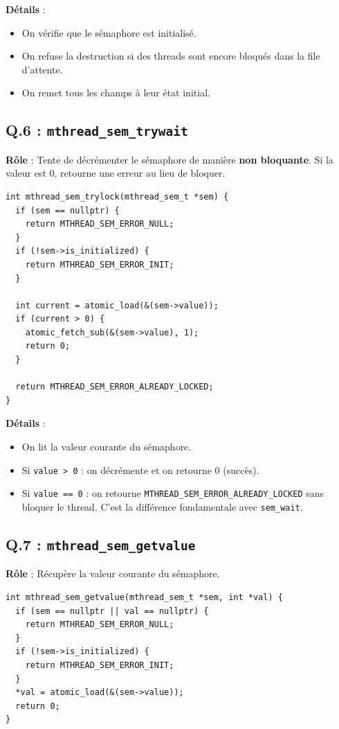 \documentclass[12pt,a4paper]{article}
\begin{document}
\textbf{Détails} :
\begin{itemize}
  \item On vérifie que le sémaphore est initialisé.
  \item On refuse la destruction si des threads sont encore bloqués dans la file d'attente.
  \item On remet tous les champs à leur état initial.
\end{itemize}

\subsection*{Q.6 : \texttt{mthread\_sem\_trywait}}

\textbf{Rôle} : Tente de décrémenter le sémaphore de manière \textbf{non bloquante}. Si la valeur est 0, retourne une erreur au lieu de bloquer.

\begin{lstlisting}
int mthread_sem_trylock(mthread_sem_t *sem) {
  if (sem == nullptr) {
    return MTHREAD_SEM_ERROR_NULL;
  }
  if (!sem->is_initialized) {
    return MTHREAD_SEM_ERROR_INIT;
  }

  int current = atomic_load(&(sem->value));
  if (current > 0) {
    atomic_fetch_sub(&(sem->value), 1);
    return 0;
  }

  return MTHREAD_SEM_ERROR_ALREADY_LOCKED;
}
\end{lstlisting}

\textbf{Détails} :
\begin{itemize}
  \item On lit la valeur courante du sémaphore.
  \item Si \texttt{value > 0} : on décrémente et on retourne 0 (succès).
  \item Si \texttt{value == 0} : on retourne \texttt{MTHREAD\_SEM\_ERROR\_ALREADY\_LOCKED} sans bloquer le thread. C'est la différence fondamentale avec \texttt{sem\_wait}.
\end{itemize}

\subsection*{Q.7 : \texttt{mthread\_sem\_getvalue}}

\textbf{Rôle} : Récupère la valeur courante du sémaphore.

\begin{lstlisting}
int mthread_sem_getvalue(mthread_sem_t *sem, int *val) {
  if (sem == nullptr || val == nullptr) {
    return MTHREAD_SEM_ERROR_NULL;
  }
  if (!sem->is_initialized) {
    return MTHREAD_SEM_ERROR_INIT;
  }
  *val = atomic_load(&(sem->value));
  return 0;
}
\end{lstlisting}
\end{document}
